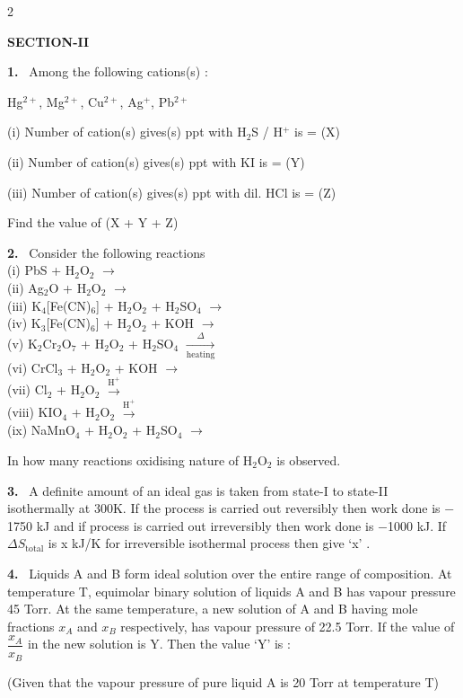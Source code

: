 \documentclass[10pt]{extarticle}
\newcommand{\sect}[1]{\par\smallskip\noindent\textbf{#1}\par}
\newcommand{\qn}[1]{\par\smallskip\noindent\textbf{#1.}~}
\begin{document}
\begin{multicols}{2}
\sect{SECTION-II}
\qn{1} Among the following cations(s) :

Hg$^{2+}$, Mg$^{2+}$, Cu$^{2+}$, Ag$^{+}$, Pb$^{2+}$

(i) Number of cation(s) gives(s) ppt with H$_2$S / H$^+$ is = (X)

(ii) Number of cation(s) gives(s) ppt with KI is = (Y)

(iii) Number of cation(s) gives(s) ppt with dil. HCl is = (Z)

Find the value of (X + Y + Z)

\qn{2} Consider the following reactions\\
(i) PbS + H$_2$O$_2$ $\to$\\
(ii) Ag$_2$O + H$_2$O$_2$ $\to$\\
(iii) K$_4$[Fe(CN)$_6$] + H$_2$O$_2$ + H$_2$SO$_4$ $\to$\\
(iv) K$_3$[Fe(CN)$_6$] + H$_2$O$_2$ + KOH $\to$\\
(v) K$_2$Cr$_2$O$_7$ + H$_2$O$_2$ + H$_2$SO$_4$ $\xrightarrow[\text{heating}]{\Delta}$\\
(vi) CrCl$_3$ + H$_2$O$_2$ + KOH $\to$\\
(vii) Cl$_2$ + H$_2$O$_2$ $\xrightarrow{\text{H}^+}$\\
(viii) KIO$_4$ + H$_2$O$_2$ $\xrightarrow{\text{H}^+}$\\
(ix) NaMnO$_4$ + H$_2$O$_2$ + H$_2$SO$_4$ $\to$

In how many reactions oxidising nature of H$_2$O$_2$ is observed.

\qn{3} A definite amount of an ideal gas is taken from state-I to state-II isothermally at 300K. If the process is carried out reversibly then work done is $-$ 1750 kJ and if process is carried out irreversibly then work done is $-$1000 kJ. If $\Delta S_{\text{total}}$ is x kJ/K for irreversible isothermal process then give `x' .

\qn{4} Liquids A and B form ideal solution over the entire range of composition. At temperature T, equimolar binary solution of liquids A and B has vapour pressure 45 Torr. At the same temperature, a new solution of A and B having mole fractions $x_A$ and $x_B$ respectively, has vapour pressure of 22.5 Torr. If the value of $\dfrac{x_A}{x_B}$ in the new solution is Y. Then the value `Y' is :

(Given that the vapour pressure of pure liquid A is 20 Torr at temperature T)


\end{multicols}
\end{document}
